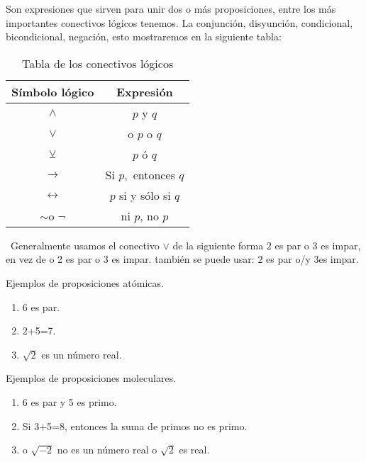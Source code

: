 Son expresiones que sirven para unir dos o más proposiciones, entre
los más importantes conectivos lógicos tenemos. La conjunción, disyunción,
condicional, bicondicional, negación, esto mostraremos en la siguiente
tabla:
\begin{table}[H]
\centering

\caption{Tabla de los conectivos lógicos}

\setlength\arrayrulewidth{1pt} 

\begin{tabular}{c|c}
\arrayrulecolor{ptctitle}\hline\cellcolor{ptctitle!50}Símbolo lógico &
\cellcolor{ptctitle!50}Expresión\tabularnewline
\hline\cellcolor{ptcbackground}$\wedge$ &
\cellcolor{ptcbackground}$p$ y $q$\tabularnewline
\hline\cellcolor{gray!50}$\vee$ &
\cellcolor{gray!50}o $p$ o $q$\tabularnewline
\hline\cellcolor{ptcbackground}$\veebar$ &
\cellcolor{ptcbackground}$p$ ó $q$\tabularnewline
\hline\cellcolor{gray!50}$\rightarrow$ &
\cellcolor{gray!50}Si $p,$ entonces $q$\tabularnewline
\hline\cellcolor{ptcbackground}$\longleftrightarrow$ &
\cellcolor{ptcbackground}$p$ si y sólo si $q$\tabularnewline
\hline\cellcolor{gray!50}$\sim$o $\neg$ &
\cellcolor{gray!50}ni $p$, no $p$\tabularnewline
\hline 
\end{tabular}
\end{table}
 \obs\ Generalmente usamos el conectivo $\vee$ de la siguiente forma
2 es par o 3 es impar, en vez de o 2 es par o 3 es impar. también
se puede usar: $2$ es par o/y $3$es impar.

\begin{lista}

\item Ejemplos de proposiciones atómicas.

\begin{ejemplo}{}
\begin{enumerate}
\item 6 es par. 
\item 2+5=7. 
\item $\sqrt{2}$ es un número real.
\end{enumerate}
\end{ejemplo}

\item Ejemplos de proposiciones moleculares.

\begin{ejemplo}{}
\begin{enumerate}
\item 6 es par y 5 es primo. 
\item Si 3+5=8, entonces la suma de primos no es primo. 
\item o $\sqrt{-2}$ no es un número real o $\sqrt{2}$ es real.
\end{enumerate}
\end{ejemplo}

\end{lista}

